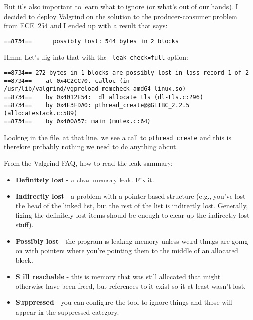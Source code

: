 But it's also important to learn what to ignore (or what's out of our hands). I decided to deploy Valgrind on the solution to the producer-consumer problem from ECE~254 and I ended up with a result that says:

\begin{verbatim}
==8734==      possibly lost: 544 bytes in 2 blocks
\end{verbatim}

Hmm. Let's dig into that with the \texttt{--leak-check=full} option:

\begin{verbatim}
==8734== 272 bytes in 1 blocks are possibly lost in loss record 1 of 2
==8734==    at 0x4C2CC70: calloc (in /usr/lib/valgrind/vgpreload_memcheck-amd64-linux.so)
==8734==    by 0x4012E54: _dl_allocate_tls (dl-tls.c:296)
==8734==    by 0x4E3FDA0: pthread_create@@GLIBC_2.2.5 (allocatestack.c:589)
==8734==    by 0x400A57: main (mutex.c:64)
\end{verbatim}

Looking in the file, at that line, we see a call to \texttt{pthread\_create} and this is therefore probably nothing we need to do anything about. 

From the Valgrind FAQ, how to read the leak summary:
\begin{itemize}
	\item \textbf{Definitely lost} - a clear memory leak. Fix it.
	\item \textbf{Indirectly lost} - a problem with a pointer based structure (e.g., you've lost the head of the linked list, but the rest of the list is indirectly lost. Generally, fixing the definitely lost items should be enough to clear up the indirectly lost stuff).
	\item \textbf{Possibly lost} - the program is leaking memory unless weird things are going on with pointers where you're pointing them to the middle of an allocated block.
	\item \textbf{Still reachable} - this is memory that was still allocated that might otherwise have been freed, but references to it exist so it at least wasn't lost.
	\item \textbf{Suppressed} - you can configure the tool to ignore things and those will appear in the suppressed category.
\end{itemize}



